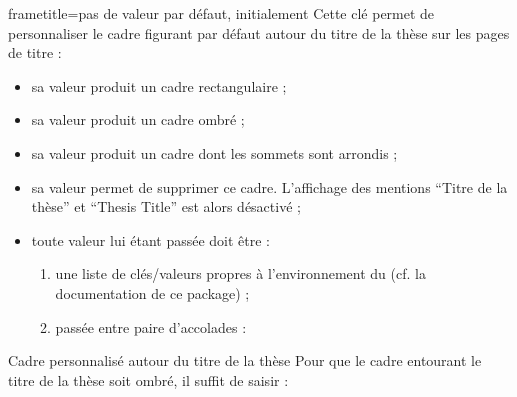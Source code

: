 {%
\begin{docKey}{frametitle}{=\textbar{}\textbar{}\textbar{}\textbar{}}{pas de valeur par défaut, initialement }
  Cette clé permet de personnaliser le cadre figurant par défaut autour du
  titre de la thèse sur les pages de titre :
  \begin{itemize}
  \item sa valeur  produit un cadre rectangulaire ;
  \item sa valeur  produit un cadre ombré ;
  \item sa valeur  produit un cadre dont les sommets sont
    arrondis ;
  \item sa valeur  permet de supprimer ce cadre. L'affichage des
    mentions \enquote{Titre de la thèse} et \foreignquote{english}{Thesis
      Title} est alors désactivé ;
  \item toute  valeur lui étant passée doit être :
    \begin{enumerate}
    \item une liste de clés/valeurs propres à l'environnement
       du  (cf. la
      documentation de ce package) ;
    \item passée entre paire d'accolades :
\begin{preamblecode}
\end{preamblecode}
    \end{enumerate}
  \end{itemize}
\end{docKey}
}

\begin{dbexample}{Cadre personnalisé autour du titre de la thèse}{}
  Pour que le cadre entourant le titre de la thèse soit ombré, il suffit de
  saisir :
\begin{preamblecode}
\maketitle[frametitle=shadowbox]
\end{preamblecode}
\end{dbexample}

